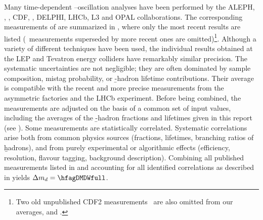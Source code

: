 Many time-dependent \Bd--\Bdbar oscillation analyses have been performed by the 
ALEPH, \babar, \belle, CDF, \dzero, DELPHI, LHCb, L3 and OPAL collaborations. 
The corresponding measurements of \dmd are summarized in 
,
where only the most recent results
are listed (\ie\ measurements superseded by more recent ones are omitted)\footnote{
  \label{foot:life_mix:CDFnote8235:2006}
  Two old unpublished CDF2 measurements~\cite{CDFnote8235:2006,CDFnote7920:2005}
  are also omitted from our averages,  and .}.
Although a variety of different techniques have been used, the 
individual \dmd
results obtained at the LEP and Tevatron energy colliders have remarkably similar precision.
The systematic uncertainties are not negligible; 
they are often dominated by sample composition, mistag probability,
or \b-hadron lifetime contributions.
Their average is compatible with the recent and more precise measurements 
from the asymmetric \B factories and the LHCb experiment.
Before being combined, the measurements are adjusted on the basis of a 
common set of input values, including the averages of the 
\b-hadron fractions and lifetimes given in this report 
(see ).
Some measurements are statistically correlated. 
Systematic correlations arise both from common physics sources 
(fractions, lifetimes, branching ratios of \b hadrons), and from purely 
experimental or algorithmic effects (efficiency, resolution, flavour tagging, 
background description). Combining all published measurements
listed in 
and accounting for all identified correlations
as described in  yields $\dmd = \hfagDMDWfull$.

